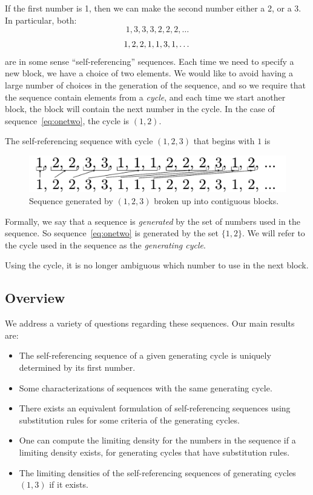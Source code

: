 \documentclass[runningheads,a4paper]{llncs}
\begin{document}
If the first number is 1, then we can make the second number either a 2, or a 3. In particular, both:
\begin{equation}
1, 3, 3, 3, 2, 2, 2, \dots
\end{equation}
\begin{equation}
1, 2, 2, 1, 1, 3, 1, \dots\\
\end{equation}
are in some sense ``self-referencing'' sequences. Each time we need to specify a new block, we have a choice of two elements. We would like to avoid having a large number of choices in the generation of the sequence, and so we require that the sequence contain elements from a \emph{cycle}, and each time we start another block, the block will contain the next number in the cycle. In the case of sequence~\ref{eq:onetwo}, the cycle is $(1,2)$.

The self-referencing sequence with cycle $(1, 2, 3)$ that begins with $1$ is
\begin{figure}
\label{fig:onetwothree}
\center
\includegraphics[width=0.5\linewidth]{sequenceBlocks123.pdf}
\caption{Sequence generated by $(1,2,3)$ broken up into contiguous blocks.}
\end{figure}

Formally, we say that a sequence is \emph{generated} by the set of numbers used in the sequence. So sequence~\ref{eq:onetwo} is generated by the set $\{1, 2\}$. We will refer to the cycle used in the sequence as the \emph{generating cycle}.

Using the cycle, it is no longer ambiguous which number to use in the next block.

\subsection{Overview}

We address a variety of questions regarding these sequences. Our main results are:
\begin{itemize}
\item The self-referencing sequence of a  given generating cycle is uniquely determined by its first number.
\item Some characterizations of sequences with the same generating cycle.
\item There exists an equivalent formulation of self-referencing sequences using substitution rules for some criteria of the generating cycles.
\item One can compute the limiting density for the numbers in the sequence if a limiting density exists, for generating cycles that have substitution rules. 
\item The limiting densities of the self-referencing sequences of generating cycles $(1,3)$ if it exists.
\end{itemize}
\end{document}

